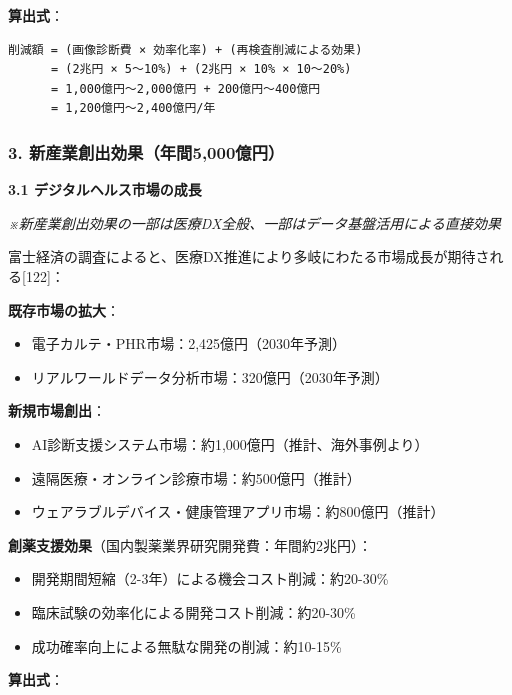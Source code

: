 \documentclass[
  a4paper,
  a4paper,
  11pt]{ltjsbook}
\providecommand{\tightlist}{%
  \setlength{\itemsep}{0pt}\setlength{\parskip}{0pt}}
\begin{document}
\textbf{算出式}：

\begin{verbatim}
削減額 = (画像診断費 × 効率化率) + (再検査削減による効果)
      = (2兆円 × 5〜10%) + (2兆円 × 10% × 10〜20%)
      = 1,000億円〜2,000億円 + 200億円〜400億円
      = 1,200億円〜2,400億円/年
\end{verbatim}

\subsubsection{3.
新産業創出効果（年間5,000億円）}\label{ux65b0ux7523ux696dux5275ux51faux52b9ux679cux5e74ux95935000ux5104ux5186}

\textbf{3.1 デジタルヘルス市場の成長}

\emph{※新産業創出効果の一部は医療DX全般、一部はデータ基盤活用による直接効果}

富士経済の調査によると、医療DX推進により多岐にわたる市場成長が期待される{[}122{]}：

\textbf{既存市場の拡大}：

\begin{itemize}
\tightlist
\item
  電子カルテ・PHR市場：2,425億円（2030年予測）
\item
  リアルワールドデータ分析市場：320億円（2030年予測）
\end{itemize}

\textbf{新規市場創出}：

\begin{itemize}
\tightlist
\item
  AI診断支援システム市場：約1,000億円（推計、海外事例より）
\item
  遠隔医療・オンライン診療市場：約500億円（推計）
\item
  ウェアラブルデバイス・健康管理アプリ市場：約800億円（推計）
\end{itemize}

\textbf{創薬支援効果}（国内製薬業界研究開発費：年間約2兆円）：

\begin{itemize}
\tightlist
\item
  開発期間短縮（2-3年）による機会コスト削減：約20-30\%
\item
  臨床試験の効率化による開発コスト削減：約20-30\%
\item
  成功確率向上による無駄な開発の削減：約10-15\%
\end{itemize}

\textbf{算出式}：
\end{document}

